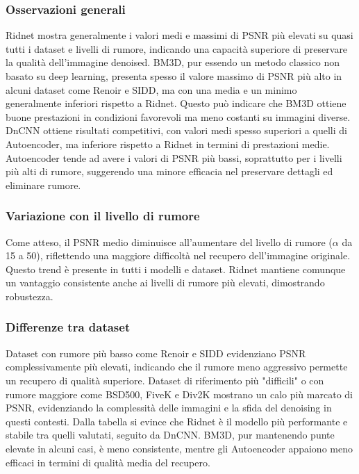 \documentclass[12pt,a4paper,openright,twoside]{book}
\begin{document}
\subsubsection*{Osservazioni generali}
Ridnet mostra generalmente i valori medi e massimi di PSNR più elevati su quasi tutti i dataset e livelli di rumore, indicando una capacità superiore di preservare la qualità dell'immagine denoised.
\whiteline
BM3D, pur essendo un metodo classico non basato su deep learning, presenta spesso il valore massimo di PSNR più alto in alcuni dataset come Renoir e SIDD, ma con una media e un minimo generalmente inferiori rispetto a Ridnet. Questo può indicare che BM3D ottiene buone prestazioni in condizioni favorevoli ma meno costanti su immagini diverse.
\whiteline
DnCNN ottiene risultati competitivi, con valori medi spesso superiori a quelli di Autoencoder, ma inferiore rispetto a Ridnet in termini di prestazioni medie.
\whiteline
Autoencoder tende ad avere i valori di PSNR più bassi, soprattutto per i livelli più alti di rumore, suggerendo una minore efficacia nel preservare dettagli ed eliminare rumore.

\subsubsection*{Variazione con il livello di rumore}
Come atteso, il PSNR medio diminuisce all'aumentare del livello di rumore ($\alpha$ da 15 a 50), riflettendo una maggiore difficoltà nel recupero dell'immagine originale. Questo trend è presente in tutti i modelli e dataset.
\whiteline
Ridnet mantiene comunque un vantaggio consistente anche ai livelli di rumore più elevati, dimostrando robustezza.

\subsubsection*{Differenze tra dataset}
Dataset con rumore più basso come Renoir e SIDD evidenziano PSNR complessivamente più elevati, indicando che il rumore meno aggressivo permette un recupero di qualità superiore.
\whiteline
Dataset di riferimento più "difficili" o con rumore maggiore come BSD500, FiveK e Div2K mostrano un calo più marcato di PSNR, evidenziando la complessità delle immagini e la sfida del denoising in questi contesti.
\whiteline
Dalla tabella si evince che Ridnet è il modello più performante e stabile tra quelli valutati, seguito da DnCNN. BM3D, pur mantenendo punte elevate in alcuni casi, è meno consistente, mentre gli Autoencoder appaiono meno efficaci in termini di qualità media del recupero.
\end{document}
